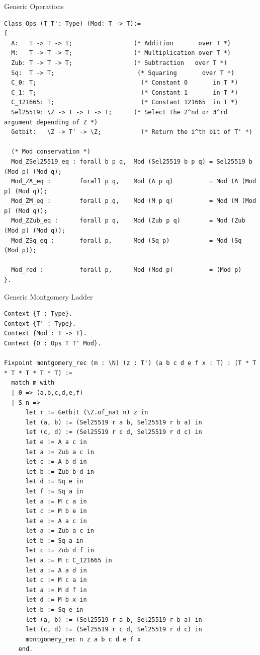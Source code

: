 \documentclass[8pt,aspectratio=169]{beamer}
\begin{document}
%
%
\begin{frame}[fragile]{Generic Operations}
	\begin{center}

		\begin{lstlisting}[language=Coq]
Class Ops (T T': Type) (Mod: T -> T):=
{
  A:   T -> T -> T;                 (* Addition       over T *)
  M:   T -> T -> T;                 (* Multiplication over T *)
  Zub: T -> T -> T;                 (* Subtraction   over T *)
  Sq:  T -> T;                       (* Squaring       over T *)
  C_0: T;                             (* Constant 0       in T *)
  C_1: T;                             (* Constant 1       in T *)
  C_121665: T;                        (* Constant 121665  in T *)
  Sel25519: \Z -> T -> T -> T;      (* Select the 2^nd or 3^rd argument depending of Z *)
  Getbit:   \Z -> T' -> \Z;           (* Return the i^th bit of T' *)

  (* Mod conservation *)
  Mod_ZSel25519_eq : forall b p q,  Mod (Sel25519 b p q) = Sel25519 b (Mod p) (Mod q);
  Mod_ZA_eq :        forall p q,    Mod (A p q)          = Mod (A (Mod p) (Mod q));
  Mod_ZM_eq :        forall p q,    Mod (M p q)          = Mod (M (Mod p) (Mod q));
  Mod_ZZub_eq :      forall p q,    Mod (Zub p q)        = Mod (Zub (Mod p) (Mod q));
  Mod_ZSq_eq :       forall p,      Mod (Sq p)           = Mod (Sq (Mod p));

  Mod_red :          forall p,      Mod (Mod p)          = (Mod p)
}.
\end{lstlisting}
	\end{center}
\end{frame}


%
%
\begin{frame}[fragile]{Generic Montgomery Ladder}
	\begin{center}
		\begin{lstlisting}[language=Coq]
Context {T : Type}.
Context {T' : Type}.
Context {Mod : T -> T}.
Context {O : Ops T T' Mod}.

Fixpoint montgomery_rec (m : \N) (z : T') (a b c d e f x : T) : (T * T * T * T * T * T) :=
  match m with
  | 0 => (a,b,c,d,e,f)
  | S n =>
      let r := Getbit (\Z.of_nat n) z in
      let (a, b) := (Sel25519 r a b, Sel25519 r b a) in
      let (c, d) := (Sel25519 r c d, Sel25519 r d c) in
      let e := A a c in
      let a := Zub a c in
      let c := A b d in
      let b := Zub b d in
      let d := Sq e in
      let f := Sq a in
      let a := M c a in
      let c := M b e in
      let e := A a c in
      let a := Zub a c in
      let b := Sq a in
      let c := Zub d f in
      let a := M c C_121665 in
      let a := A a d in
      let c := M c a in
      let a := M d f in
      let d := M b x in
      let b := Sq e in
      let (a, b) := (Sel25519 r a b, Sel25519 r b a) in
      let (c, d) := (Sel25519 r c d, Sel25519 r d c) in
      montgomery_rec n z a b c d e f x
    end.
\end{lstlisting}
	\end{center}
\end{frame}
\end{document}
